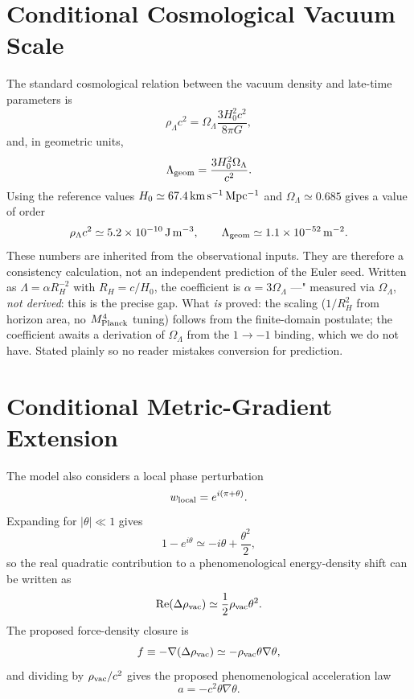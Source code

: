 \documentclass[twocolumn]{aastex631}
\begin{document}
\section{Conditional Cosmological Vacuum Scale}
The standard cosmological relation between the vacuum density and late-time parameters is
\begin{equation}
\rho_\Lambda c^2
=\Omega_\Lambda\frac{3H_0^2c^2}{8\pi G},
\end{equation}
and, in geometric units,
\begin{equation}
\Lambda_{\rm geom}
=\frac{3H_0^2\Omega_\Lambda}{c^2}.
\label{eq:lambda}
\end{equation}
Using the reference values $H_0\simeq67.4\,{\rm km\,s^{-1}\,Mpc^{-1}}$ and $\Omega_\Lambda\simeq0.685$ gives a value of order
\[
\rho_\Lambda c^2\simeq5.2\times10^{-10}\,{\rm J\,m^{-3}},
\qquad
\Lambda_{\rm geom}\simeq1.1\times10^{-52}\,{\rm m^{-2}}.
\]
These numbers are inherited from the observational inputs. They are therefore a consistency calculation, not an independent prediction of the Euler seed. Written as $\Lambda=\alpha R_H^{-2}$ with $R_H=c/H_0$, the coefficient is $\alpha=3\Omega_\Lambda$ ---" measured via $\Omega_\Lambda$, \emph{not derived}: this is the precise gap. What \emph{is} proved: the scaling ($1/R_H^2$ from horizon area, no $M_{\rm Planck}^4$ tuning) follows from the finite-domain postulate; the coefficient awaits a derivation of $\Omega_\Lambda$ from the $1\to-1$ binding, which we do not have. Stated plainly so no reader mistakes conversion for prediction.

\section{Conditional Metric-Gradient Extension}
The model also considers a local phase perturbation
\[
w_{\rm local}=e^{i(\pi+\theta)}.
\]
Expanding for $|\theta|\ll1$ gives
\[
1-e^{i\theta}
\simeq- i\theta+\frac{\theta^2}{2},
\]
so the real quadratic contribution to a phenomenological energy-density shift can be written as
\[
\operatorname{Re}(\Delta\rho_{\rm vac})
\simeq\frac12\rho_{\rm vac}\theta^2.
\]
The proposed force-density closure is
\begin{equation}
f\equiv-\nabla(\Delta\rho_{\rm vac})
\simeq-\rho_{\rm vac}\theta\nabla\theta,
\end{equation}
and dividing by $\rho_{\rm vac}/c^2$ gives the proposed phenomenological acceleration law
\begin{equation}
\boxed{a=-c^2\theta\nabla\theta}.
\label{eq:propulsion}
\end{equation}
\end{document}
